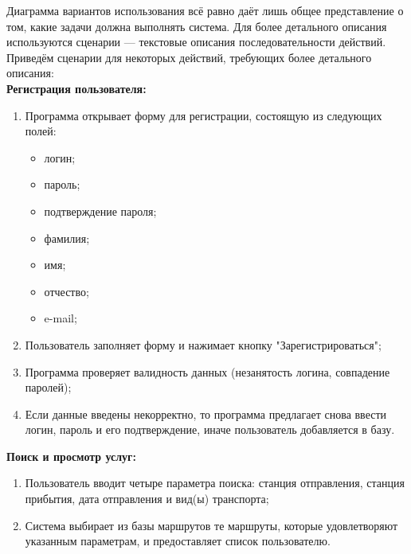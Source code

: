 Диаграмма вариантов использования всё равно даёт лишь общее представление о том, какие задачи должна выполнять система. Для более детального описания используются сценарии --- текстовые описания последовательности действий. Приведём сценарии для некоторых действий, требующих более детального описания:\\



{\bf Регистрация пользователя:}

\begin{enumerate}
  \item{Программа открывает форму для регистрации, состоящую из следующих полей:}
  \begin{itemize}
    \item{логин;}
    \item{пароль;}
    \item{подтверждение пароля;}
    \item{фамилия;}
    \item{имя;}
    \item{отчество;}
    \item{e-mail;}
  \end{itemize}
  \item{Пользователь заполняет форму и нажимает кнопку "Зарегистрироваться";}
  \item{Программа проверяет валидность данных (незанятость логина, совпадение паролей);}
  \item{Если данные введены некорректно, то программа предлагает снова ввести логин, пароль и его подтверждение, иначе пользователь добавляется в базу.}
\end{enumerate}

{\bf Поиск и просмотр услуг:}
\begin{enumerate}
  \item{Пользователь вводит четыре параметра поиска: станция отправления, станция прибытия, дата отправления и вид(ы) транспорта;}
  \item{Система выбирает из базы маршрутов те маршруты, которые удовлетворяют указанным параметрам, и предоставляет список пользователю.}
\end{enumerate}

